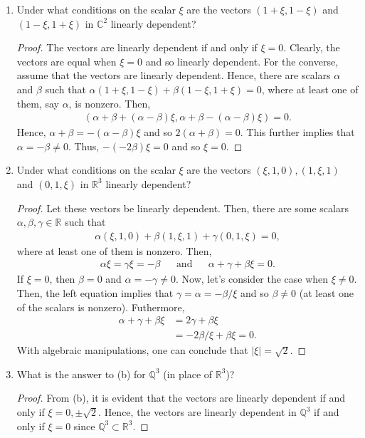 \documentclass[12pt]{article}
\newcommand{\R}{\mathbb{R}}
\newcommand{\Q}{\mathbb{Q}}
\newenvironment{problem}[2][Problem]{\begin{trivlist} \item[\hskip \labelsep {\bfseries #1}\hskip \labelsep {\bfseries #2.}]}{\end{trivlist}}
\begin{document}
\begin{problem}{4}
\begin{enumerate}
  \item Under what conditions on the scalar $\xi$ are the vectors $(1+\xi, 1-\xi)$ and $(1-\xi,1+\xi)$ in $\mathbb{C}^{2}$ linearly dependent?
\begin{proof}
  The vectors are linearly dependent if and only if $\xi = 0$. Clearly, the vectors are equal when $\xi = 0$ and so linearly dependent. For the converse, assume that the vectors are linearly dependent. Hence, there are scalars $\alpha$ and $\beta$ such that $\alpha(1+\xi,1-\xi) + \beta(1-\xi,1+\xi)=0$, where at least one of them, say $\alpha$, is nonzero. Then,
\begin{align*}
  (\alpha+\beta+(\alpha-\beta)\xi, \alpha+\beta-(\alpha-\beta)\xi)=0.
\end{align*}
Hence, $\alpha+\beta = -(\alpha-\beta)\xi$ and so $2(\alpha+\beta)=0$. This further implies that $\alpha = -\beta\neq 0$. Thus, $-(-2\beta)\xi=0$ and so $\xi =0$.
\end{proof}
  \item Under what conditions on the scalar $\xi$ are the vectors $(\xi,1,0),(1,\xi,1)$ and $(0,1,\xi)$ in $\R^{3}$ linearly dependent?
\begin{proof}
  Let these vectors be linearly dependent. Then, there are some scalars $\alpha,\beta,\gamma\in \R$ such that 
\begin{align*}
  \alpha (\xi,1,0) + \beta(1,\xi,1) + \gamma(0,1,\xi) = 0,
\end{align*}
where at least one of them is nonzero. Then,
\begin{align*}
  \alpha\xi = \gamma \xi = -\beta& &\text{and}& &\alpha+\gamma+\beta\xi = 0.
\end{align*}
If $\xi = 0$, then $\beta = 0$ and $\alpha=-\gamma \neq 0$. Now, let's consider the case when $\xi \neq 0$. Then, the left equation implies that $\gamma = \alpha = -\beta/\xi$ and so $\beta\neq 0$ (at least one of the scalars is nonzero). Futhermore,  
\begin{align*}
  \alpha + \gamma + \beta\xi &= 2\gamma + \beta\xi \\
  &= -2\beta/\xi + \beta\xi = 0.
\end{align*}
With algebraic manipulations, one can conclude that $|\xi| = \sqrt{2}$.
\end{proof}
  \item What is the answer to (b) for $\Q^{3}$ (in place of $\R^{3}$)?
\begin{proof}
  From (b), it is evident that the vectors are linearly dependent if and only if $\xi = 0,\pm \sqrt{2}$. Hence, the vectors are linearly dependent in $\Q^{3}$ if and only if $\xi = 0$ since $\Q^{3}\subset \R^{3}$. 
\end{proof}
\end{enumerate}
\end{problem}
\end{document}

